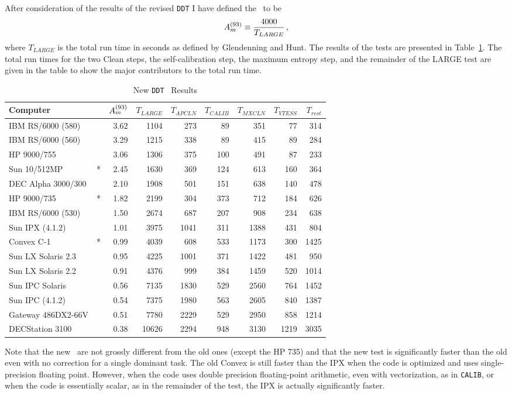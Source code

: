 After consideration of the results of the revised {\tt DDT} I have
defined the \AMark\ to be
$$
      A_m^{(93)} \equiv \frac{4000}{T_{LARGE}} \, ,
$$
where $T_{LARGE}$ is the total run time in seconds as defined by
Glendenning and Hunt.  The results of the tests are presented in
Table~\ref{ta:newAm}.  The total run times for the two Clean steps,
the self-calibration step, the maximum entropy step, and the remainder
of the LARGE test are given in the table to show the major
contributors to the total run time.
\begin{table}
\protect\begin{center}
\protect\begin{tabular}{|lc|r|r|r|r|r|r|r|} \hline
Computer & & $A_m^{(93)}$ & $T_{LARGE}$ & $T_{APCLN}$ &$T_{CALIB}$
    & $T_{MXCLN}$ & $T_{VTESS}$&$T_{rest}$ \\  \hline
IBM RS/6000 (580) &   & 3.62 &  1104 &  273 &  89 &  351 &   77 &  314 \\
IBM RS/6000 (560) &   & 3.29 &  1215 &  338 &  89 &  415 &   89 &  284 \\
HP 9000/755       &   & 3.06 &  1306 &  375 & 100 &  491 &   87 &  233 \\
Sun 10/512MP      & * & 2.45 &  1630 &  369 & 124 &  613 &  160 &  364 \\
DEC Alpha 3000/300&   & 2.10 &  1908 &  501 & 151 &  638 &  140 &  478 \\
HP 9000/735       & * & 1.82 &  2199 &  304 & 373 &  712 &  184 &  626 \\
IBM RS/6000 (530) &   & 1.50 &  2674 &  687 & 207 &  908 &  234 &  638 \\
Sun IPX (4.1.2)   &   & 1.01 &  3975 & 1041 & 311 & 1388 &  431 &  804 \\
Convex C-1        & * & 0.99 &  4039 &  608 & 533 & 1173 &  300 & 1425 \\
Sun LX Solaris 2.3&   & 0.95 &  4225 & 1001 & 371 & 1422 &  481 &  950 \\
Sun LX Solaris 2.2&   & 0.91 &  4376 &  999 & 384 & 1459 &  520 & 1014 \\
Sun IPC Solaris   &   & 0.56 &  7135 & 1830 & 529 & 2560 &  764 & 1452 \\
Sun IPC (4.1.2)   &   & 0.54 &  7375 & 1980 & 563 & 2605 &  840 & 1387 \\
Gateway 486DX2-66V&   & 0.51 &  7780 & 2229 & 529 & 2950 &  858 & 1214 \\
DECStation 3100   &   & 0.38 & 10626 & 2294 & 948 & 3130 & 1219 & 3035 \\
\hline
\end{tabular}
\end{center}
\caption{New {\tt DDT} \AMark\ Results}
\label{ta:newAm}
\end{table}
Note that the new \AMarks\ are not grossly different from the old ones
(except the HP 735) and that the new test is significantly faster than
the old even with no correction for a single dominant task.  The old
Convex is still faster than the IPX when the code is optimized and
uses single-precision floating point.  However, when the code uses
double precision floating-point arithmetic, even with vectorization,
as in {\tt CALIB}, or when the code is essentially scalar, as in the
remainder of the test, the IPX is actually significantly faster.

